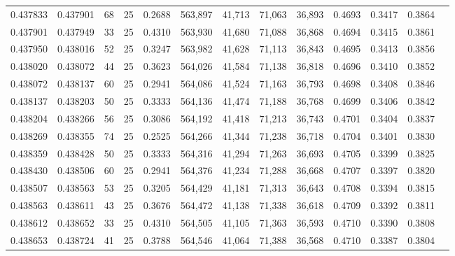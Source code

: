 \begin{tabular}{rrrrrrrrrrrrr}
0.437833 & 0.437901 &    68 &  25 &                                     0.2688 & 563,897 &  41,713 &  71,063 &  36,893 & 0.4693 & 0.3417 & 0.3864 \\
0.437901 & 0.437949 &    33 &  25 &                                     0.4310 & 563,930 &  41,680 &  71,088 &  36,868 & 0.4694 & 0.3415 & 0.3861 \\
0.437950 & 0.438016 &    52 &  25 &                                     0.3247 & 563,982 &  41,628 &  71,113 &  36,843 & 0.4695 & 0.3413 & 0.3856 \\
0.438020 & 0.438072 &    44 &  25 &                                     0.3623 & 564,026 &  41,584 &  71,138 &  36,818 & 0.4696 & 0.3410 & 0.3852 \\
0.438072 & 0.438137 &    60 &  25 &                                     0.2941 & 564,086 &  41,524 &  71,163 &  36,793 & 0.4698 & 0.3408 & 0.3846 \\
0.438137 & 0.438203 &    50 &  25 &                                     0.3333 & 564,136 &  41,474 &  71,188 &  36,768 & 0.4699 & 0.3406 & 0.3842 \\
0.438204 & 0.438266 &    56 &  25 &                                     0.3086 & 564,192 &  41,418 &  71,213 &  36,743 & 0.4701 & 0.3404 & 0.3837 \\
0.438269 & 0.438355 &    74 &  25 &                                     0.2525 & 564,266 &  41,344 &  71,238 &  36,718 & 0.4704 & 0.3401 & 0.3830 \\
0.438359 & 0.438428 &    50 &  25 &                                     0.3333 & 564,316 &  41,294 &  71,263 &  36,693 & 0.4705 & 0.3399 & 0.3825 \\
0.438430 & 0.438506 &    60 &  25 &                                     0.2941 & 564,376 &  41,234 &  71,288 &  36,668 & 0.4707 & 0.3397 & 0.3820 \\
0.438507 & 0.438563 &    53 &  25 &                                     0.3205 & 564,429 &  41,181 &  71,313 &  36,643 & 0.4708 & 0.3394 & 0.3815 \\
0.438563 & 0.438611 &    43 &  25 &                                     0.3676 & 564,472 &  41,138 &  71,338 &  36,618 & 0.4709 & 0.3392 & 0.3811 \\
0.438612 & 0.438652 &    33 &  25 &                                     0.4310 & 564,505 &  41,105 &  71,363 &  36,593 & 0.4710 & 0.3390 & 0.3808 \\
0.438653 & 0.438724 &    41 &  25 &                                     0.3788 & 564,546 &  41,064 &  71,388 &  36,568 & 0.4710 & 0.3387 & 0.3804 \\

\end{tabular}
